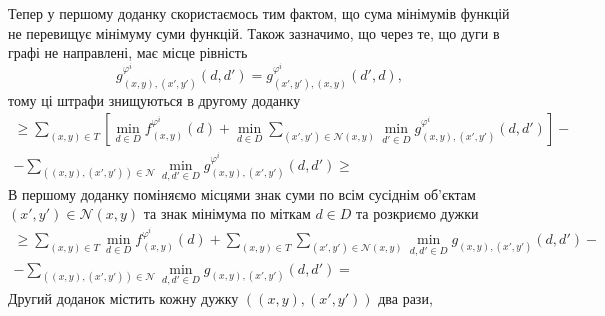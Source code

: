 Тепер у першому доданку скористаємось тим фактом,
що сума мінімумів функцій не перевищує мінімуму суми функцій.
Також зазначимо, що через те, що дуги в графі не направлені,
має місце рівність
\begin{equation*}
    g_{\left(x, y \right), \left(x', y' \right)}^{\varphi^i}
            \left(d, d' \right) =
    g_{\left(x', y' \right), \left(x, y \right)}^{\varphi^i}
            \left(d', d \right),
\end{equation*}
тому ці штрафи знищуються в другому доданку
\begin{equation*}
\begin{gathered}
    \ge \sum \limits_{\left(x, y \right) \in T} \left[
        \min \limits_{d \in D}
            f_{\left(x, y \right)}^{\varphi^i} \left(d \right) +
        \min \limits_{d \in D}
            \sum \limits_{\left(x', y' \right) \in \mathcal{N} \left(x, y \right)}
                \min \limits_{d' \in D}
                    g_{\left(x, y \right), \left(x', y' \right)}^{\varphi^i}
                        \left(d, d' \right)
    \right] - \\
    - \sum \limits_{\left(\left(x, y \right), \left(x', y' \right) \right) \in \mathcal{N}}
        \min \limits_{d, d' \in D}
            g_{\left(x, y \right), \left(x', y' \right)}^{\varphi^i}
                \left(d, d' \right) \ge
\end{gathered}
\end{equation*}
В першому доданку поміняємо місцями знак суми по всім сусіднім об'єктам
$\left(x', y' \right) \in \mathcal{N} \left(x, y \right)$
та знак мінімума по міткам $d \in D$ та розкриємо дужки
\begin{equation*}
\begin{gathered}
    \ge \sum \limits_{\left(x, y \right) \in T}
        \min \limits_{d \in D}
            f_{\left(x, y \right)}^{\varphi^i} \left( d \right) +
    \sum \limits_{\left(x, y \right) \in T}
        \sum \limits_{\left(x', y' \right) \in \mathcal{N} \left(x, y \right)}
            \min \limits_{d, d' \in D}
                g_{\left(x, y \right), \left(x', y' \right)}
                    \left( d, d' \right) - \\
    - \sum \limits_{\left(\left(x, y \right), \left(x', y' \right) \right) \in \mathcal{N}}
        \min \limits_{d, d' \in D}
            g_{\left(x, y \right), \left(x', y' \right)} \left( d, d' \right) =
\end{gathered}
\end{equation*}
Другий доданок містить кожну дужку
$\left( \left(x, y \right), \left(x', y' \right) \right)$ два рази,
